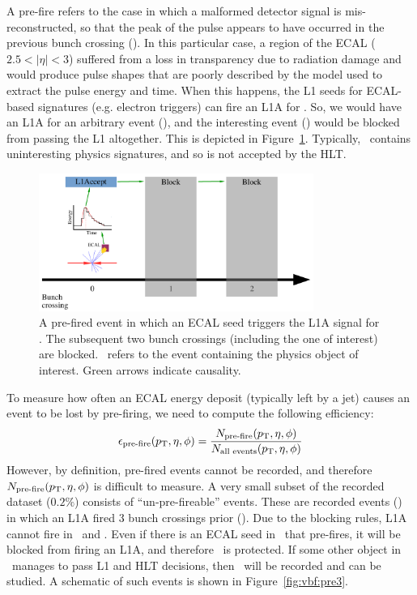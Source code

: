 A pre-fire refers to the case in which a malformed detector signal is mis-reconstructed, so that the peak of the pulse appears to have occurred in the previous bunch crossing ().   
In this particular case, a region of the ECAL ($2.5 < |\eta|<3$) suffered from a loss in transparency due to radiation damage and would produce pulse shapes that are poorly described by the model used to extract the pulse energy and time. 
When this happens, the L1 seeds for ECAL-based signatures (e.g. electron triggers) can fire an L1A for .
So, we would have an L1A for an arbitrary event (), and the interesting event () would be blocked from passing the L1 altogether. 
This is depicted in Figure~\ref{fig:vbf:pre2}.
Typically, ~contains uninteresting physics signatures, and so is not accepted by the HLT.

\begin{figure}
    \begin{center}
        \includegraphics[width=0.8\textwidth,page=2]{figures/vbf/triggers/l1diag.pdf}
        \caption{A pre-fired event in which an ECAL seed triggers the L1A signal for . 
                 The subsequent two bunch crossings (including the one of interest) are blocked. 
                 ~refers to the event containing the physics object of interest.
                 Green arrows indicate causality.}
        \label{fig:vbf:pre2}
    \end{center}
\end{figure}

To measure how often an ECAL energy deposit (typically left by a jet) causes an event to be lost by pre-firing, we need to compute the following efficiency:
\begin{equation}
    \epsilon_\text{pre-fire}(p_\mathrm{T},\eta,\phi) = \frac{N_\text{pre-fire}(p_\mathrm{T},\eta,\phi)}{N_\text{all events}(p_\mathrm{T},\eta,\phi)}
\end{equation}
However, by definition, pre-fired events cannot be recorded, and therefore $N_\text{pre-fire}(p_\mathrm{T},\eta,\phi)$ is difficult to measure.
A very small subset of the recorded dataset ($0.2\%$) consists of ``un-pre-fireable'' events.
These are recorded events () in which an L1A fired 3 bunch crossings prior ().
Due to the blocking rules, L1A cannot fire in ~and .
Even if there is an ECAL seed in ~that pre-fires, it will be blocked from firing an L1A, and therefore ~is protected.
If some other object in ~manages to pass L1 and HLT decisions, then ~will be recorded and can be studied.
A schematic of such events is shown in Figure~\ref{fig:vbf:pre3}.

